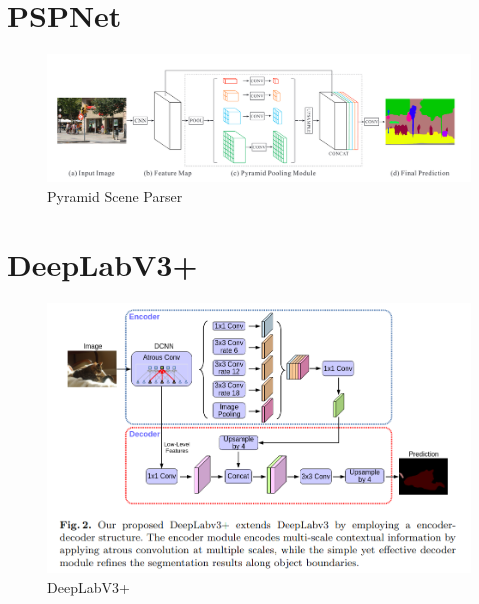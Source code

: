 \documentclass[11pt]{beamer}
\begin{document}
\section{PSPNet}
\begin{figure}
  \begin{center}
    \includegraphics[scale=1.1]{images/pspnet.png}
  \end{center}
  \caption{Pyramid Scene Parser}\label{fig:}
\end{figure}

\section{DeepLabV3+}
\begin{figure}
  \begin{center}
  \end{center}
  \includegraphics[scale=1.1]{images/deeplabv3p.png}
  \caption{DeepLabV3+}\label{fig:}
\end{figure}
\end{document}
